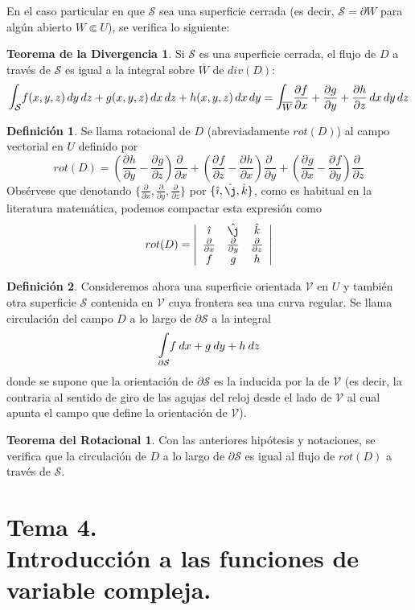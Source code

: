 \documentclass[12pt,twoside]{report}
\newcommand\mc[1]{\mathcal{#1}}
\newcommand{\bbint}{\mathlarger{\mathlarger{\int}}}
\newcommand*{\pd}[3][]{\ensuremath{\dfrac{\partial^{#1} #2}{\partial #3}}}
\theoremstyle{azul}
\theoremstyle{azul2}
\theoremstyle{plain}
\theoremstyle{definition}
\newtheorem*{theodiv}{Teorema de la Divergencia}
\newtheorem*{theorot}{Teorema del Rotacional}
\newtheorem{defin}{Definición}[chapter]
\theoremstyle{remark}
\begin{document}
En el caso particular en que $\mc{S}$ sea una superficie cerrada (es decir, $\mc{S}=\partial W$ para algún abierto $W \Subset U$), se verifica lo siguiente:

\begin{theodiv}
Si $\mc{S}$ es una superficie cerrada, el flujo de $D$ a través de $\mc{S}$ es igual a la integral sobre $\overline{W}$ de $div(D)$: $$\bbint_{\mc{S}} f(x,y,z)\,dy\,dz + g(x,y,z)\,dx\,dz + h(x,y,z)\, dx \, dy = \bbint_{\overline{W}} \frac{\partial f}{\partial x} + \frac{\partial g}{\partial y} + \frac{\partial h}{\partial z} \,dx\,dy\,dz$$
\end{theodiv}
\begin{defin}
Se llama rotacional de $D$ (abreviadamente $rot(D)$) al campo vectorial en $U$ definido por 
$$rot(D)=\left(\pd{h}{y} - \pd{g}{z} \right) \pd{\:}{x} + \left(\pd{f}{z} - \pd{h}{x} \right) \pd{\:}{y}+\left(\pd{g}{x} - \pd{f}{y} \right) \pd{\:}{z}$$
Obsérvese que denotando $\{\frac{\partial}{\partial x},\frac{\partial}{\partial y},\frac{\partial}{\partial z}\}$ por $\{\hat{\imath},  \hat{\j},  \hat{k}\}$, como es habitual en la literatura matemática, podemos compactar esta expresión como $$rot(D) = \left|\begin{array}{ccc}
    \hat{\imath} &  \hat{\j} &  \hat{k}  \\
    \frac{\partial}{\partial x} & \frac{\partial}{\partial y} & \frac{\partial}{\partial z} \\
    f & g & h 
\end{array}\right| $$
\end{defin}
\begin{defin}
Consideremos ahora una superficie orientada $\mc{V}$ en $U$ y también otra superficie $\mc{S}$ contenida en $\mc{V}$ cuya frontera sea una curva regular. Se llama circulación del campo $D$ a lo largo de $\partial \mc{S}$ a la integral
$$\underset{\partial \mc{S}}{\bbint} f \: dx + g \: dy + h \: dz$$
donde se supone que la orientación de $\partial \mc{S}$ es la inducida por la de $\mc{V}$ (es decir, la contraria al sentido de giro de las agujas del reloj desde el lado de $\mc{V}$ al cual apunta el campo que define la orientación de $\mc{V}$).
\end{defin}
\begin{theorot} Con las anteriores hipótesis y notaciones, se verifica que la circulación de $D$ a lo largo de $\partial \mc S$ es igual al flujo de $rot(D)$ a través de $\mc S$. 
\end{theorot}

\chapter{Tema 4. \\ Introducción a las funciones de variable compleja.}
\end{document}
